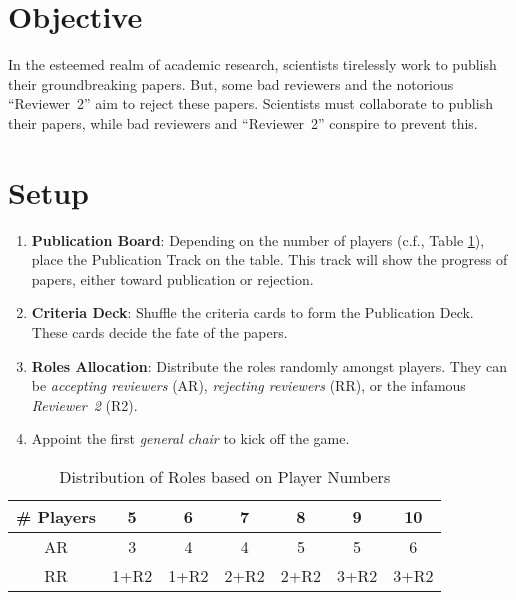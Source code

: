 \documentclass[sigplan,screen,nonacm]{acmart}
\begin{document}


\maketitle

\section*{Objective}

In the esteemed realm of academic research, scientists tirelessly work to publish their groundbreaking papers. But, some bad reviewers and the notorious ``Reviewer~2'' aim to reject these papers. Scientists must collaborate to publish their papers, while bad reviewers and ``Reviewer~2'' conspire to prevent this.

\section{Setup}

\begin{enumerate}
	\item \textbf{Publication Board}: Depending on the number of players (c.f., Table \ref{tab:role_distribution}), place the Publication Track on the table. This track will show the progress of papers, either toward publication or rejection.
	\item \textbf{Criteria Deck}: Shuffle the criteria cards to form the Publication Deck. These cards decide the fate of the papers.
	\item \textbf{Roles Allocation}: Distribute the roles randomly amongst players. They can be \textit{accepting reviewers} (AR), \textit{rejecting reviewers} (RR), or the infamous \textit{Reviewer~2} (R2).
	\item Appoint the first \textit{general chair} to kick off the game.
\end{enumerate}

	\begin{table}[h]
	\centering
	\begin{tabularx}{.48\textwidth}{ccccccc}
		\toprule
		\textbf{\# Players} & \textbf{5} & \textbf{6} & \textbf{7} & \textbf{8} & \textbf{9} & \textbf{10} \\
		\midrule
		AR & 3 & 4 & 4 & 5 & 5 & 6 \\
		\midrule
		RR & 1+R2 & 1+R2 & 2+R2 & 2+R2 & 3+R2 & 3+R2 \\
		\bottomrule
	\end{tabularx}

	\caption{Distribution of Roles based on Player Numbers}
	\label{tab:role_distribution}
\end{table}
\end{document}
